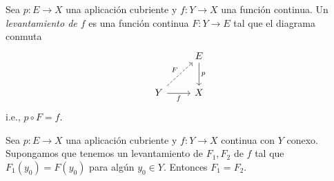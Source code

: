 \begin{definicion}
    Sea $p:E\to X$ una aplicación cubriente y $f:Y\to X$ una función continua. Un \textit{levantamiento de $f$} es una función continua $F:Y\to E$ tal que el diagrama conmuta
    \begin{equation*}
        \begin{tikzcd}[column sep=0.85cm, row sep =0.85cm]
            & E \arrow[d,"p"]\\
            Y\arrow[ur,"F",dashed]\arrow[r,"f"'] & X
        \end{tikzcd}
    \end{equation*}
    i.e., $p\circ F=f$.
\end{definicion}
\begin{prop}
    Sea $p:E\to X$ una aplicación cubriente y $f:Y\to X$ continua con $Y$ conexo. Supongamos que tenemos un levantamiento de $F_1,F_2$ de $f$ tal que $F_1(y_0)=F(y_0)$ para algún $y_0\in Y$. Entonces $F_1=F_2$.
\end{prop}

